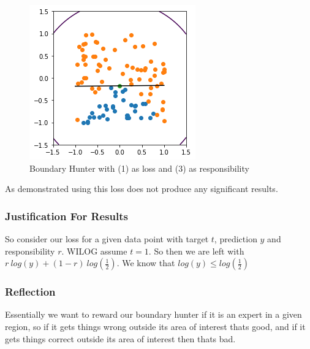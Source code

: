 \documentclass{article}
\begin{document}
\begin{figure}[H]
\centering
  \begin{minipage}[b]{0.4\textwidth}
    \includegraphics[width=\textwidth]{BoundaryHunter-Attempt1-01.png}
    \caption{Boundary Hunter with (1) as loss and (3) as responsibility}
  \end{minipage}
  \hfill
\end{figure}

As demonstrated using this loss does not produce any significant results.

\subsubsection{Justification For Results}
So consider our loss for a given data point with target $t$, prediction $y$ and responsibility $r$. WILOG assume $t = 1$. So then we are left with $r\ log(y) + (1-r)\ log(\frac{1}{2})$. We know that $log(y) \leq log(\frac{1}{2})$

\subsubsection{Reflection}
Essentially we want to reward our boundary hunter if it is an expert in a given region, so if it gets things wrong outside its area of interest thats good, and if it gets things correct outside its area of interest then thats bad.
\end{document}
